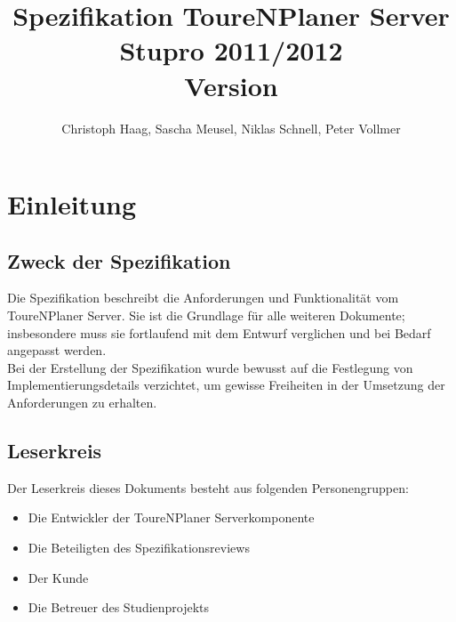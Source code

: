 \documentclass[a4paper,10pt,titlepage,parskip=true]{article}
\author{Christoph Haag, Sascha Meusel, Niklas Schnell, Peter Vollmer}
\title{Spezifikation ToureNPlaner Server\\ Stupro 2011/2012\\ Version }
\begin{document}
\maketitle
{}
\setcounter{page}{1}
\tableofcontents
\clearpage
{}
\setcounter{page}{1}

\section{Einleitung}
\subsection{Zweck der Spezifikation}
Die Spezifikation beschreibt die Anforderungen und Funktionalität vom ToureNPlaner Server. Sie ist die Grundlage für alle weiteren Dokumente; insbesondere muss sie fortlaufend mit dem Entwurf verglichen und bei Bedarf angepasst werden.\\
Bei der Erstellung der Spezifikation wurde bewusst auf die Festlegung von Implementierungsdetails verzichtet, um gewisse Freiheiten in der Umsetzung der Anforderungen zu erhalten.

\subsection{Leserkreis}
Der Leserkreis dieses Dokuments besteht aus folgenden Personengruppen:
\begin{itemize}
\item Die Entwickler der ToureNPlaner Serverkomponente
\item Die Beteiligten des Spezifikationsreviews
\item Der Kunde
\item Die Betreuer des Studienprojekts
\end{itemize}
\end{document}
